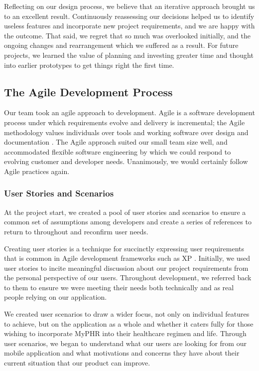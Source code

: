 \documentclass{l3proj}
\begin{document}
Reflecting on our design process, we believe that an iterative approach brought us to an excellent result. Continuously reassessing our decisions helped us to identify useless features and incorporate new project requirements, and we are happy with the outcome. That said, we regret that so much was overlooked initially, and the ongoing changes and rearrangement which we suffered as a result. For future projects, we learned the value of planning and investing greater time and thought into earlier prototypes to get things right the first time.


\subsection{The Agile Development Process} \label{sec:3.2}
Our team took an agile approach to development. Agile is a software development process under which requirements evolve and delivery is incremental; the Agile methodology values individuals over tools and working software over design and documentation \cite{AgileMain}. The Agile approach suited our small team size well, and accommodated flexible software engineering by which we could respond to evolving customer and developer needs. Unanimously, we would certainly follow Agile practices again.


\subsubsection{User Stories and Scenarios} \label{sec:3.2.1}
At the project start, we created a pool of user stories and scenarios to ensure a common set of assumptions among developers and create a series of references to return to throughout and reconfirm user needs.

Creating user stories \cite[p254]{psd-notes} is a technique for succinctly expressing user requirements that is common in Agile development frameworks such as XP \cite{extreme}. Initially, we used user stories to incite meaningful discussion about our project requirements from the personal perspective of our users. Throughout development, we referred back to them to ensure we were meeting their needs both technically and as real people relying on our application. 

We created user scenarios \cite{userscenarios} to draw a wider focus, not only on individual features to achieve, but on the application as a whole and whether it caters fully for those wishing to incorporate MyPHR into their healthcare regimen and life. Through user scenarios, we began to understand what our users are looking for from our mobile application and what motivations and concerns they have about their current situation that our product can improve.
\end{document}

